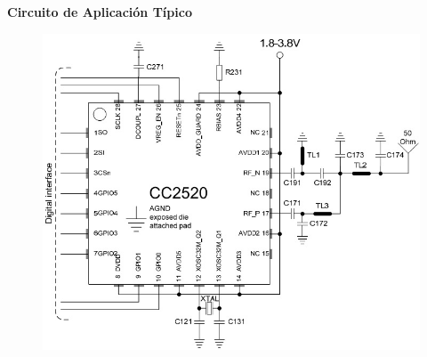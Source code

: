 \documentclass[aspectratio=169]{beamer}
\begin{document}
\begin{frame}{\textbf{Circuito de Aplicación Típico}}	
	\begin{figure}[H]
		\includegraphics[height=1\textheight]{./imagenes/applicationcircuit.jpg}
	\end{figure}	
\end{frame}
\end{document}
